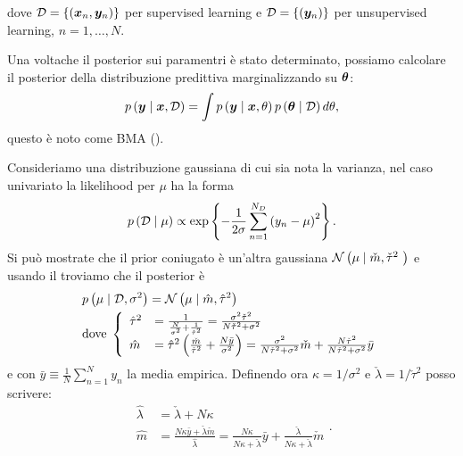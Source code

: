 \documentclass[10pt]{article}
\begin{document}
    dove \(\mathcal{D} = \{ \left( \bm{x}_n, \bm{y}_n \right) \} \) per supervised learning
    e \(\mathcal{D} = \{ \left( \bm{y}_n \right) \} \) per unsupervised learning, \(n = 1,\ldots, N \).

    Una voltache il posterior sui paramentri è stato determinato, possiamo calcolare il posterior
    della distribuzione predittiva marginalizzando su \(\bm{\theta}\):
    \begin{equation}
        p \left( \bm{y}\mid\bm{x}, \mathcal{D} \right) = \int p \left( \bm{y}\mid\bm{x}, \theta \right) p \left( \bm{\theta}\mid\mathcal{D} \right) d\theta,
    \end{equation}
    questo è noto come BMA ().

    Consideriamo una distribuzione gaussiana di cui sia nota la varianza, nel caso univariato la
    likelihood per \(\mu\) ha la forma
    \begin{equation}
        p \left( \mathcal{D}\mid\mu \right) \propto \exp \left\{ - \frac{1}{2\sigma} \sum_{n=1}^{N_D} \left( y_n - \mu \right)^2 \right\}.
    \end{equation}
    Si può mostrate che il prior coniugato è un'altra gaussiana
    \(\mathcal{N}\left( \mu\mid\check{m}, \check{\tau}^2 \ \right)\) e usando il  troviamo che il
    posterior è
    \begin{equation}
        \begin{split}
            &p \left( \mu\mid\mathcal{D}, \sigma^2 \right) = \mathcal{N} \left( \mu\mid\hat{m}, \hat{\tau}^2 \right) \\
            &\text{dove}\;
                \left\{\begin{array}{ll}
                    \hat{\tau}^2 &= \frac{1}{\frac{N}{\sigma^2} + \frac{1}{\check{\tau}^2}} = \frac{\sigma^2\check{\tau}^2}{N\check{\tau}^2 + \sigma^2} \\
                    \hat{m} &= \hat{\tau}^2 \left( \frac{\check{m}}{\check{\tau}^2} + \frac{N\bar{y}}{\sigma^2} \right) = \frac{\sigma^2}{N\check{\tau}^2 + \sigma^2}\check{m} + \frac{N\check{\tau}^2}{N\check{\tau}^2 + \sigma^2}\bar{y}                    
                \end{array}\right.
        \end{split}
    \end{equation}
    e con \(\bar{y}\equiv\frac{1}{N}\sum_{n=1}^N y_n\) la media empirica.
    Definendo ora \(\kappa = 1/\sigma^2\) e \(\check{\lambda} = 1/\check{\tau}^2\) posso scrivere:
    \begin{equation}
        \begin{split}
            \hat{\lambda} &= \check{\lambda} + N\kappa \\
            \hat{m} &= \frac{N\kappa\bar{y} + \check{\lambda}\check{m}}{\hat{\lambda}} = \frac{N\kappa}{N\kappa + \check{\lambda}}\bar{y} + \frac{\check{\lambda}}{N\kappa + \check{\lambda}}\check{m}
        \end{split}.
    \end{equation}
\end{document}

